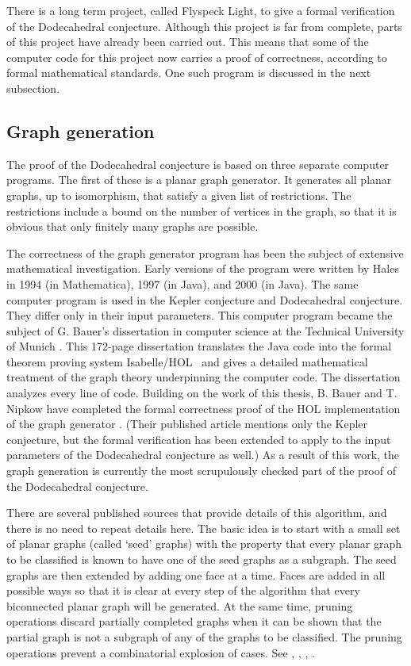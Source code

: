 \documentclass{article} %
\begin{document}
There is a long term project, called Flyspeck Light, to give a formal
verification of the Dodecahedral conjecture. Although this project is
far from complete, parts of this project have already been carried
out. This means that some of the computer code for this project now
carries a proof of correctness, according to formal mathematical
standards. One such program is discussed in the next subsection.

\subsection{Graph generation}
\label{sec:gg}

The proof of the Dodecahedral conjecture is based on three separate
computer programs. The first of these is a planar graph generator. It
generates all planar graphs, up to isomorphism, that satisfy a given
list of restrictions. The restrictions include a bound on the number
of vertices in the graph, so that it is obvious that only finitely
many graphs are possible.

The correctness of the graph generator program has been the subject of
extensive mathematical investigation. Early versions of the program
were written by Hales in 1994 (in Mathematica),
1997 (in Java), and 2000 (in Java). The same computer
program is used in the Kepler conjecture and Dodecahedral conjecture.
They differ only in their input parameters. This computer program
became the subject of G. Bauer's dissertation in computer science at
the Technical University of Munich \cite{Bauer:2006:Thesis}. This
172-page dissertation translates the Java code into the formal theorem
proving system Isabelle/HOL~\cite{Paulson:1994:Isabelle} and gives a
detailed mathematical treatment of the graph theory underpinning the
computer code. The dissertation analyzes every line of code. Building
on the work of this thesis, B. Bauer and T. Nipkow have completed the
formal correctness proof of the HOL implementation of the graph
generator \cite{Nipkow:2005:Tame}. (Their published article mentions
only the Kepler conjecture, but the formal verification has been
extended to apply to the input parameters of the Dodecahedral
conjecture as well.) As a result of this work, the graph generation is
currently the most scrupulously checked part of the proof of the
Dodecahedral conjecture.

There are several published sources that provide details of this
algorithm, and there is no need to repeat details here. The basic idea
is to start with a small set of planar graphs (called `seed' graphs)
with the property that every planar graph to be classified is known to
have one of the seed graphs as a subgraph. The seed graphs are then
extended by adding one face at a time. Faces are added in all possible
ways so that it is clear at every step of the algorithm that every
biconnected planar graph will be generated. At the same time, pruning
operations discard partially completed graphs when it can be shown
that the partial graph is not a subgraph of any of the graphs to be
classified. The pruning operations prevent a combinatorial explosion
of cases. See \cite[\S5]{Hales:2003:DCG}, \cite[\S19]{Hales:2006:DCG},
\cite{Bauer:2006:Thesis}, \cite{Nipkow:2005:Tame}.
\end{document}
